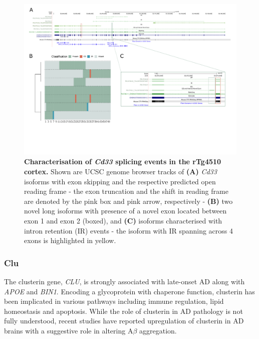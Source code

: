 \begin{landscape}
	\begin{figure}[htp]
		\centering
		\captionsetup{width=1.3\textwidth}
		\includegraphics[page=5,trim={0 3.5cm 0 0},scale = 0.85]{Figures/TargetGenes_Annotation_Landscape.pdf}
		\caption[Characterisation of the \textit{Cd33} splicing landscape]%
		{\textbf{Characterisation of \textit{Cd33} splicing events in the rTg4510 cortex.} Shown are UCSC genome browser tracks of \textbf{(A)} \textit{Cd33} isoforms with exon skipping and the respective predicted open reading frame - the exon truncation and the shift in reading frame are denoted by the pink box and pink arrow, respectively - \textbf{(B)} two novel long isoforms with presence of a novel exon located between exon 1 and exon 2 (boxed), and \textbf{(C)} isoforms characterised with intron retention (IR) events - the isoform with IR spanning across 4 exons is highlighted in yellow.}    
		\label{fig:cd33_orf}
	\end{figure}
\end{landscape}
\restoregeometry 

\newpage
\subsubsection{Clu}
The clusterin gene, \textit{CLU}, is strongly associated with late-onset AD along with \textit{APOE} and \textit{BIN1}\cite{Lambert2013}. Encoding a glycoprotein with chaperone function, clusterin has been implicated in various pathways including immune regulation, lipid homeostasis and apoptosis\cite{Foster2019}. While the role of clusterin in AD pathology is not fully understood, recent studies have reported upregulation of clusterin in AD brains with a suggestive role in altering A$\beta$ aggregation\cite{Jackson2019}. 

